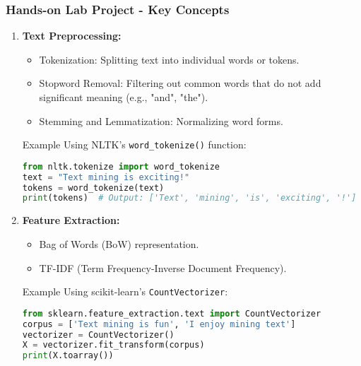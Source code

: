 \documentclass[aspectratio=169]{beamer}
\begin{document}
\begin{frame}[fragile]
    \frametitle{Hands-on Lab Project - Key Concepts}
    \begin{enumerate}
        \item \textbf{Text Preprocessing:}
        \begin{itemize}
            \item Tokenization: Splitting text into individual words or tokens.
            \item Stopword Removal: Filtering out common words that do not add significant meaning (e.g., "and", "the").
            \item Stemming and Lemmatization: Normalizing word forms.
        \end{itemize}

        \begin{block}{Example}
            Using NLTK's \texttt{word\_tokenize()} function:
            \begin{lstlisting}[language=python]
from nltk.tokenize import word_tokenize
text = "Text mining is exciting!"
tokens = word_tokenize(text)
print(tokens)  # Output: ['Text', 'mining', 'is', 'exciting', '!']
            \end{lstlisting}
        \end{block}

        \item \textbf{Feature Extraction:}
        \begin{itemize}
            \item Bag of Words (BoW) representation.
            \item TF-IDF (Term Frequency-Inverse Document Frequency).
        \end{itemize}

        \begin{block}{Example}
            Using scikit-learn’s \texttt{CountVectorizer}:
            \begin{lstlisting}[language=python]
from sklearn.feature_extraction.text import CountVectorizer
corpus = ['Text mining is fun', 'I enjoy mining text']
vectorizer = CountVectorizer()
X = vectorizer.fit_transform(corpus)
print(X.toarray())
            \end{lstlisting}
        \end{block}
    \end{enumerate}
\end{frame}
\end{document}
